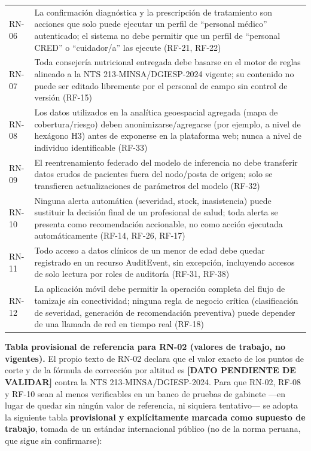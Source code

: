 \documentclass[11pt,a4paper]{article}
\begin{document}
{\begin{longtable}[]{@{}
  >{\raggedright\arraybackslash}p{}
  >{\raggedright\arraybackslash}p{}@{}}
RN-06 & La confirmación diagnóstica y la prescripción de tratamiento son acciones que solo puede ejecutar un perfil de ``personal médico'' autenticado; el sistema no debe permitir que un perfil de ``personal CRED'' o ``cuidador/a'' las ejecute (RF-21, RF-22) \\
RN-07 & Toda consejería nutricional entregada debe basarse en el motor de reglas alineado a la NTS 213-MINSA/DGIESP-2024 vigente; su contenido no puede ser editado libremente por el personal de campo sin control de versión (RF-15) \\
RN-08 & Los datos utilizados en la analítica geoespacial agregada (mapa de cobertura/riesgo) deben anonimizarse/agregarse (por ejemplo, a nivel de hexágono H3) antes de exponerse en la plataforma web; nunca a nivel de individuo identificable (RF-33) \\
RN-09 & El reentrenamiento federado del modelo de inferencia no debe transferir datos crudos de pacientes fuera del nodo/posta de origen; solo se transfieren actualizaciones de parámetros del modelo (RF-32) \\
RN-10 & Ninguna alerta automática (severidad, stock, inasistencia) puede sustituir la decisión final de un profesional de salud; toda alerta se presenta como recomendación accionable, no como acción ejecutada automáticamente (RF-14, RF-26, RF-17) \\
RN-11 & Todo acceso a datos clínicos de un menor de edad debe quedar registrado en un recurso AuditEvent, sin excepción, incluyendo accesos de solo lectura por roles de auditoría (RF-31, RF-38) \\
RN-12 & La aplicación móvil debe permitir la operación completa del flujo de tamizaje sin conectividad; ninguna regla de negocio crítica (clasificación de severidad, generación de recomendación preventiva) puede depender de una llamada de red en tiempo real (RF-18) \\
\end{longtable}
}

\textbf{Tabla provisional de referencia para RN-02 (valores de trabajo, no vigentes).} El propio texto de RN-02 declara que el valor exacto de los puntos de corte y de la fórmula de corrección por altitud es \textbf{{[}DATO PENDIENTE DE VALIDAR{]}} contra la NTS 213-MINSA/DGIESP-2024. Para que RN-02, RF-08 y RF-10 sean al menos verificables en un banco de pruebas de gabinete ---en lugar de quedar sin ningún valor de referencia, ni siquiera tentativo--- se adopta la siguiente tabla \textbf{provisional y explícitamente marcada como supuesto de trabajo}, tomada de un estándar internacional público (no de la norma peruana, que sigue sin confirmarse):
\end{document}
